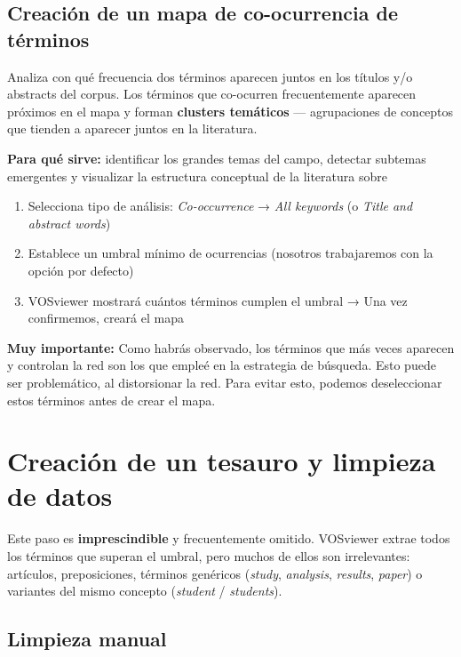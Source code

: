 \documentclass[
]{book}
\providecommand{\tightlist}{%
  \setlength{\itemsep}{0pt}\setlength{\parskip}{0pt}}
\begin{document}
\subsection{Creación de un mapa de co-ocurrencia de términos}\label{creaciuxf3n-de-un-mapa-de-co-ocurrencia-de-tuxe9rminos}

Analiza con qué frecuencia dos términos aparecen juntos en los títulos y/o abstracts del corpus. Los términos que co-ocurren frecuentemente aparecen próximos en el mapa y forman \textbf{clusters temáticos} --- agrupaciones de conceptos que tienden a aparecer juntos en la literatura.

\textbf{Para qué sirve:} identificar los grandes temas del campo, detectar subtemas emergentes y visualizar la estructura conceptual de la literatura sobre

\begin{enumerate}
\def\labelenumi{\arabic{enumi}.}
\tightlist
\item
  Selecciona tipo de análisis: \emph{Co-occurrence} → \emph{All keywords} (o \emph{Title and abstract words})
\item
  Establece un umbral mínimo de ocurrencias (nosotros trabajaremos con la opción por defecto)
\item
  VOSviewer mostrará cuántos términos cumplen el umbral → Una vez confirmemos, creará el mapa
\end{enumerate}

\protect{}\label{aviso-vosviewer}
\textbf{Muy importante:} Como habrás observado, los términos que más veces aparecen y controlan la red son los que empleé en la estrategia de búsqueda. Esto puede ser problemático, al distorsionar la red. Para evitar esto, podemos deseleccionar estos términos antes de crear el mapa.

\section{Creación de un tesauro y limpieza de datos}\label{creaciuxf3n-de-un-tesauro-y-limpieza-de-datos}

Este paso es \textbf{imprescindible} y frecuentemente omitido. VOSviewer extrae todos los términos que superan el umbral, pero muchos de ellos son irrelevantes: artículos, preposiciones, términos genéricos (\emph{study}, \emph{analysis}, \emph{results}, \emph{paper}) o variantes del mismo concepto (\emph{student} / \emph{students}).

\subsection{Limpieza manual}\label{limpieza-manual}
\end{document}

